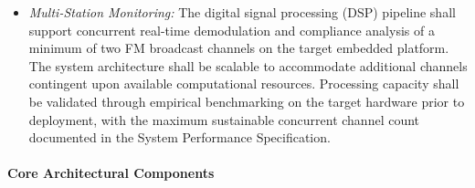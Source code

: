 \documentclass[11pt]{report}
\begin{document}
\begin{itemize}
	\item 
\textit{Multi-Station Monitoring:} The digital signal processing (DSP) 
pipeline shall support concurrent real-time demodulation and compliance 
analysis of a minimum of two FM broadcast channels on the target embedded 
platform. The system architecture shall be scalable to accommodate additional 
channels contingent upon available computational resources. Processing capacity 
shall be validated through empirical benchmarking on the target hardware prior 
to deployment, with the maximum sustainable concurrent channel count documented 
in the System Performance Specification.
	
\end{itemize}

\newpage
\paragraph*{Core Architectural Components}
\end{document}
